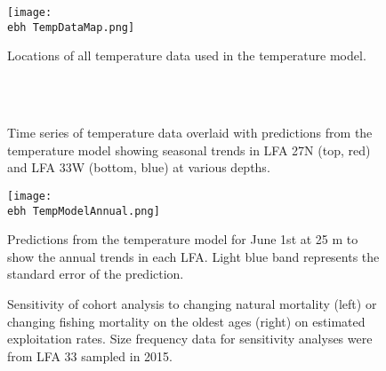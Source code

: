 \documentclass[11pt]{article}
\newcommand{\e}{/backup/bio_data/bio.lobster/figures/} %
\newcommand{\ebh}{/backup/bio_data/bio.lobster/figures/LFA2733Framework2018/} %
\begin{document}
    \begin{figure}
    \centering
        \texttt{[image: \\ebh TempDataMap.png]}
        \caption{Locations of all temperature data used in the temperature model.}

    \end{figure}

        \begin{figure}
        \centering
                \\
                \\
        
         \caption{Time series of temperature data overlaid with predictions from the temperature model showing seasonal trends in LFA 27N (top, red) and LFA 33W (bottom, blue) at various depths.}
        \end{figure}



    \begin{figure}
    \centering
        \texttt{[image: \\ebh TempModelAnnual.png]}
        \caption{Predictions from the temperature model for June 1st at 25 m to show the annual trends in each LFA. Light blue band represents the standard error of the prediction.}

    \end{figure}




\begin{figure}
\centering
              \caption{Sensitivity of cohort analysis to changing natural mortality (left) or changing fishing mortality on the oldest ages (right) on estimated exploitation rates. Size frequency data for sensitivity analyses were from LFA 33 sampled in 2015.}
\end{figure}
\end{document}
